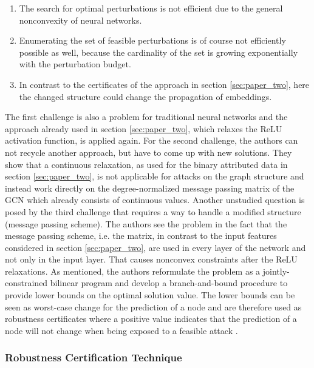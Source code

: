 \documentclass[a4paper,preprint]{sig-alternate}
\begin{document}
\begin{enumerate}
    \item The search for optimal perturbations is not efficient due to the general nonconvexity of neural networks. \label{enum:challenge_one}
    \item Enumerating the set of feasible perturbations is of course not efficiently possible as well, because the cardinality of the
    set is growing exponentially with the perturbation budget. \label{enum:challenge_two}
    \item In contrast to the certificates of the approach in section \ref{sec:paper_two}, here the changed structure could change 
    the propagation of embeddings. \label{enum:challenge_three}
\end{enumerate}

The first challenge is also a problem for traditional neural networks and the approach already used
in section \ref{sec:paper_two}, which relaxes the ReLU activation function, is applied again. \cite{10.1145/3394486.3403217}
For the second challenge, the authors can not recycle another approach, but have to come up with new solutions.
They show that a continuous relaxation, as used for the binary attributed data in section \ref{sec:paper_two}, 
is not applicable for attacks on the graph structure and instead work directly on the degree-normalized message passing matrix 
of the GCN which already consists of continuous values.
Another unstudied question is posed by the third challenge that requires a way to handle a modified structure (message passing scheme). \cite{10.1145/3394486.3403217}
The authors see the problem in the fact that the message passing scheme, i.e. the matrix, in contrast to the input features considered
in section \ref{sec:paper_two}, are used in every layer of the network and not only in the input layer.
That causes nonconvex constraints after the ReLU relaxations. \cite{10.1145/3394486.3403217}
As mentioned, the authors reformulate the problem as a jointly-constrained bilinear program and develop a branch-and-bound procedure 
to provide lower bounds on the optimal solution value.
The lower bounds can be seen as worst-case change for the prediction of a node and are therefore used as 
robustness certificates where a positive value indicates that the prediction of a node will not
change when being exposed to a feasible attack . \cite{10.1145/3394486.3403217}

\subsubsection{Robustness Certification Technique}
\end{document}
